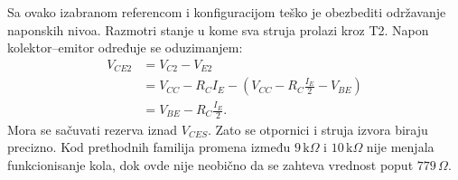 Sa ovako izabranom referencom i konfiguracijom teško je obezbediti održavanje naponskih nivoa. Razmotri stanje u kome sva struja prolazi kroz T2. Napon kolektor–emitor određuje se oduzimanjem:
\[\begin{aligned}V_{CE2}&=V_{C2}-V_{E2}\\&=V_{CC}-R_CI_E-\left(V_{CC}-R_C\frac{I_E}2-V_{BE}\right)\\&=V_{BE}-R_C\frac{I_E}2.\end{aligned}\]
Mora se sačuvati rezerva iznad $V_{CES}$. Zato se otpornici i struja izvora biraju precizno. Kod prethodnih familija promena između $9\,\mathrm{k}\Omega$ i $10\,\mathrm{k}\Omega$ nije menjala funkcionisanje kola, dok ovde nije neobično da se zahteva vrednost poput $779\,\Omega$.
